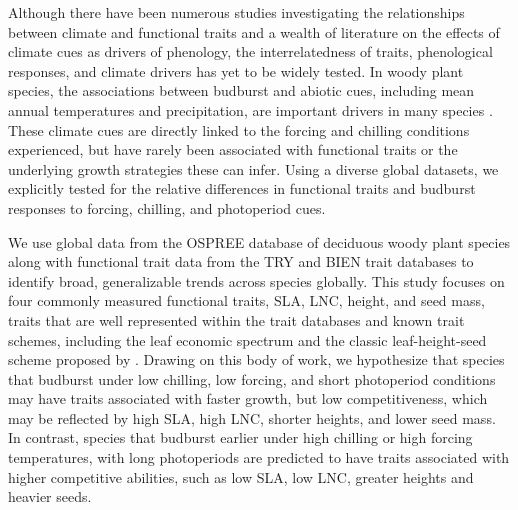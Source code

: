 \documentclass{article}\usepackage[]{graphicx}\usepackage[]{color}
\begin{document}
Although there have been numerous studies investigating the relationships between climate and functional traits and a wealth of literature on the effects of climate cues as drivers of phenology, the interrelatedness of traits, phenological responses, and climate drivers has yet to be widely tested. 
In woody plant species, the associations between budburst and abiotic cues, including mean annual temperatures and precipitation, are important drivers in many species \citep{citation}. These climate cues are directly linked to the forcing and chilling conditions experienced, but have rarely been associated with functional traits or the underlying growth strategies these can infer.  Using a diverse global datasets, we explicitly tested for the relative differences in functional traits and budburst responses to forcing, chilling, and photoperiod cues.  

We use global data from the OSPREE database of deciduous woody plant species along with functional trait data from the TRY and BIEN trait databases to identify broad, generalizable trends across species globally. This study focuses on four commonly measured functional traits, SLA, LNC, height, and seed mass, traits that are well represented within the trait databases and known trait schemes, including the leaf economic spectrum \citep{Wright2004} and the classic leaf-height-seed scheme proposed by \cite{Westoby1998}. Drawing on this body of work, we hypothesize that species that budburst under low chilling, low forcing, and short photoperiod conditions may have traits associated with faster growth, but low competitiveness, which may be reflected by high SLA, high LNC, shorter heights, and lower seed mass. In contrast, species that budburst earlier under high chilling or high forcing temperatures, with long photoperiods are predicted to have traits associated with higher competitive abilities, such as low SLA, low LNC, greater heights and heavier seeds. 

\pagebreak
% 

\end{document}
